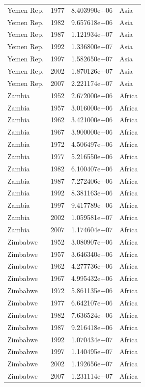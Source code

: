 \documentclass[
  letterpaper,
  DIV=11,
  numbers=noendperiod]{scrreprt}
\begin{document}
\begin{tcolorbox}
\begin{tabular}{lrrl}
Yemen Rep.               &  1977 &  8.403990e+06 &      Asia \\
Yemen Rep.               &  1982 &  9.657618e+06 &      Asia \\
Yemen Rep.               &  1987 &  1.121934e+07 &      Asia \\
Yemen Rep.               &  1992 &  1.336800e+07 &      Asia \\
Yemen Rep.               &  1997 &  1.582650e+07 &      Asia \\
Yemen Rep.               &  2002 &  1.870126e+07 &      Asia \\
Yemen Rep.               &  2007 &  2.221174e+07 &      Asia \\
Zambia                   &  1952 &  2.672000e+06 &    Africa \\
Zambia                   &  1957 &  3.016000e+06 &    Africa \\
Zambia                   &  1962 &  3.421000e+06 &    Africa \\
Zambia                   &  1967 &  3.900000e+06 &    Africa \\
Zambia                   &  1972 &  4.506497e+06 &    Africa \\
Zambia                   &  1977 &  5.216550e+06 &    Africa \\
Zambia                   &  1982 &  6.100407e+06 &    Africa \\
Zambia                   &  1987 &  7.272406e+06 &    Africa \\
Zambia                   &  1992 &  8.381163e+06 &    Africa \\
Zambia                   &  1997 &  9.417789e+06 &    Africa \\
Zambia                   &  2002 &  1.059581e+07 &    Africa \\
Zambia                   &  2007 &  1.174604e+07 &    Africa \\
Zimbabwe                 &  1952 &  3.080907e+06 &    Africa \\
Zimbabwe                 &  1957 &  3.646340e+06 &    Africa \\
Zimbabwe                 &  1962 &  4.277736e+06 &    Africa \\
Zimbabwe                 &  1967 &  4.995432e+06 &    Africa \\
Zimbabwe                 &  1972 &  5.861135e+06 &    Africa \\
Zimbabwe                 &  1977 &  6.642107e+06 &    Africa \\
Zimbabwe                 &  1982 &  7.636524e+06 &    Africa \\
Zimbabwe                 &  1987 &  9.216418e+06 &    Africa \\
Zimbabwe                 &  1992 &  1.070434e+07 &    Africa \\
Zimbabwe                 &  1997 &  1.140495e+07 &    Africa \\
Zimbabwe                 &  2002 &  1.192656e+07 &    Africa \\
Zimbabwe                 &  2007 &  1.231114e+07 &    Africa \\
\bottomrule
\end{tabular}


\end{tcolorbox}
\end{document}

